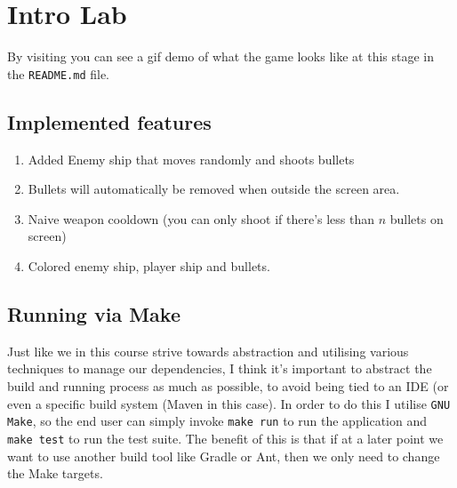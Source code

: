 \section{Intro Lab}
By visiting  you can see a gif demo of what
the game looks like at this stage in the \texttt{README.md} file.

\subsection{Implemented features}
\begin{enumerate}
        \item Added Enemy ship that moves randomly and shoots bullets
        \item Bullets will automatically be removed when outside the screen area.
        \item Naive weapon cooldown\: (you can only shoot if there's less than $n$ bullets on screen)
        \item Colored enemy ship, player ship and bullets.
\end{enumerate}

\subsection{Running via Make}
Just like we in this course strive towards abstraction and utilising various
techniques to manage our dependencies, I think it's important to abstract the build and
running process as much as possible, to avoid being tied to an IDE (or even a
specific build system (Maven in this case). In order to do this I utilise \texttt{GNU
Make}, so the end user can simply invoke \texttt{make run} to run the
application and \texttt{make test} to run the test suite.
The benefit of this is that if at a later point we want to use another build tool like Gradle or Ant,
then we only need to change the Make targets.
